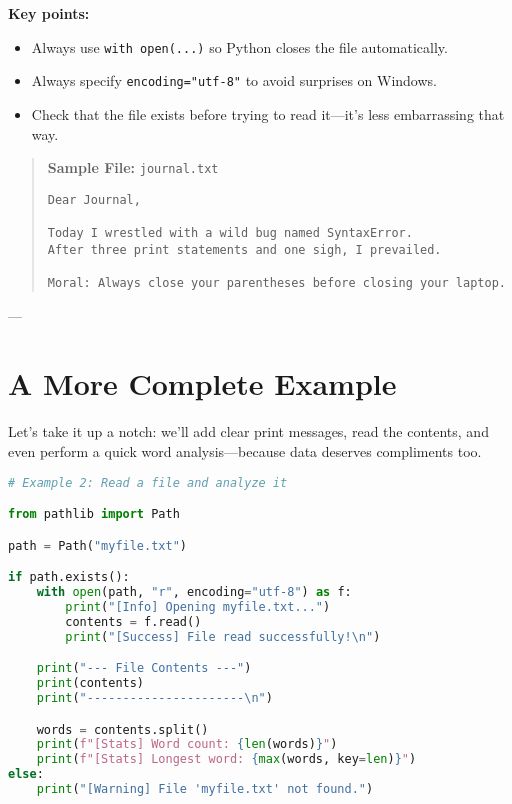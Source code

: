 \noindent
\textbf{Key points:}
\begin{itemize}
  \item Always use \texttt{with open(...)} so Python closes the file automatically.
  \item Always specify \texttt{encoding="utf-8"} to avoid surprises on Windows.
  \item Check that the file exists before trying to read it---it's less embarrassing that way.
\end{itemize}

\begin{quote}
\textbf{Sample File:} \texttt{journal.txt}
\begin{verbatim}
Dear Journal,

Today I wrestled with a wild bug named SyntaxError.
After three print statements and one sigh, I prevailed.

Moral: Always close your parentheses before closing your laptop.
\end{verbatim}
\end{quote}

---

\section{A More Complete Example}

Let’s take it up a notch: we’ll add clear print messages, read the contents,  
and even perform a quick word analysis---because data deserves compliments too.

\begin{lstlisting}[language=Python, caption={Reading and analyzing file contents.}]
# Example 2: Read a file and analyze it

from pathlib import Path

path = Path("myfile.txt")

if path.exists():
    with open(path, "r", encoding="utf-8") as f:
        print("[Info] Opening myfile.txt...")
        contents = f.read()
        print("[Success] File read successfully!\n")

    print("--- File Contents ---")
    print(contents)
    print("----------------------\n")

    words = contents.split()
    print(f"[Stats] Word count: {len(words)}")
    print(f"[Stats] Longest word: {max(words, key=len)}")
else:
    print("[Warning] File 'myfile.txt' not found.")
\end{lstlisting}

